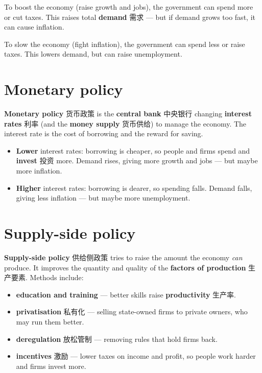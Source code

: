 \documentclass[11pt]{article}
\begin{document}
To boost the economy (raise growth and jobs), the government can spend more or cut taxes. This raises total \textbf{demand} 需求 — but if demand grows too fast, it can cause inflation.

To slow the economy (fight inflation), the government can spend less or raise taxes. This lowers demand, but can raise unemployment.

\section*{Monetary policy}

\textbf{Monetary policy} 货币政策 is the \textbf{central bank} 中央银行 changing \textbf{interest rates} 利率 (and the \textbf{money supply} 货币供给) to manage the economy. The interest rate is the cost of borrowing and the reward for saving.

\begin{itemize}
\item \textbf{Lower} interest rates: borrowing is cheaper, so people and firms spend and \textbf{invest} 投资 more. Demand rises, giving more growth and jobs — but maybe more inflation.

\item \textbf{Higher} interest rates: borrowing is dearer, so spending falls. Demand falls, giving less inflation — but maybe more unemployment.

\end{itemize}

\section*{Supply-side policy}

\textbf{Supply-side policy} 供给侧政策 tries to raise the amount the economy \emph{can} produce. It improves the quantity and quality of the \textbf{factors of production} 生产要素. Methods include:

\begin{itemize}
\item \textbf{education and training} — better skills raise \textbf{productivity} 生产率.

\item \textbf{privatisation} 私有化 — selling state-owned firms to private owners, who may run them better.

\item \textbf{deregulation} 放松管制 — removing rules that hold firms back.

\item \textbf{incentives} 激励 — lower taxes on income and profit, so people work harder and firms invest more.

\end{itemize}
\end{document}
